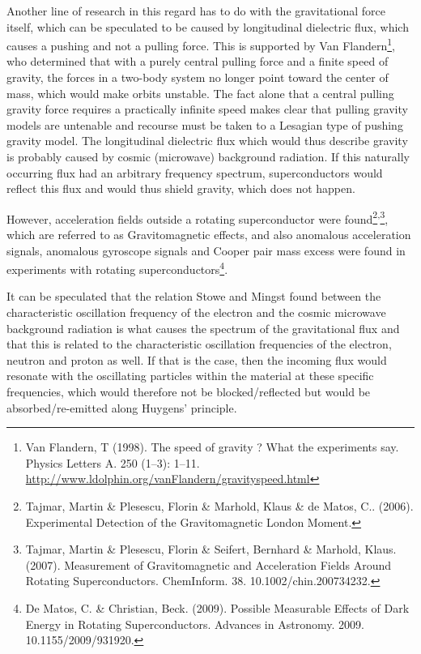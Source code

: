 \documentclass[a4paper]{article}
\newcommand\textstyleNone[1]{#1}
\begin{document}
{
\textstyleNone{{Another line of research in this regard has to do
with the gravitational force itself, which }{can be speculated
to}{ be caused by longitudinal dielectric flux, which causes a
pushing and not a pulling force. This is supported by Van Flandern}}\footnote{ Van Flandern, T (1998). The speed of
gravity ? What the experiments say. Physics Letters A. 250 (1--3): 1--11.
\url{http://www.ldolphin.org/vanFlandern/gravityspeed.html} \par
}\textstyleNone{{, who determined that with a purely central
pulling force and a finite speed of gravity, the forces in a two-body system no longer point toward the center of mass,
which would make orbits unstable. The fact alone that a central pulling gravity force requires a practically infinite
speed makes clear that pulling gravity models are untenable and recourse must be taken to a Lesagian type of pushing
gravity model.}}\textstyleNone{{ The longitudinal dielectric flux
which would
}{thus}{
describe gravity is probably caused by cosmic (microwave) background radiation. If this naturally occurring flux had an
arbitrary frequency spectrum, superconductors would reflect this flux and would thus shield gravity, which does not
happen.}}}

{
\textstyleNone{{However, acceleration fields outside a rotating
superconductor were found}}\footnote{\textstyleNone{ Tajmar, Martin \& Plesescu, Florin \& Marhold, Klaus \& de Matos,
C.. (2006). Experimental Detection of the Gravitomagnetic London Moment. }\par
}\textstyleNone{{\textsuperscript{,}}}\footnote{\textstyleNone{
Tajmar, Martin \& Plesescu, Florin \& Seifert, Bernhard \& Marhold, Klaus. (2007). Measurement of Gravitomagnetic and
Acceleration Fields Around Rotating Superconductors. ChemInform. 38. 10.1002/chin.200734232. }\par
}\textstyleNone{{, which are referred to as Gravitomagnetic
effects, and also anomalous acceleration signals, anomalous gyroscope signals and Cooper pair mass excess were found in
experiments with rotating superconductors}}\footnote{\textstyleNone{ De Matos, C. \& Christian, Beck. (2009). Possible
Measurable Effects of Dark Energy in Rotating Superconductors. Advances in Astronomy. 2009. 10.1155/2009/931920.
}}\textstyleNone{{. }}}

{
\textstyleNone{{It can be speculated that the relation Stowe and
Mingst found between the characteristic oscillation frequency of the electron and the cosmic microwave background
radiation is what causes the spectrum of the gravitational flux and that this is related to the characteristic
oscillation frequencies of the electron, neutron and proton as well. If that is the case, then the incoming flux would
resonate with the oscillating particles within the material at these specific frequencies, which would therefore not be
blocked/reflected but would be absorbed/re-emitted along Huygens' principle.}}}
\end{document}
